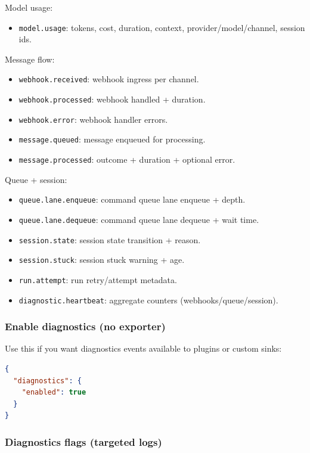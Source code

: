 Model usage:

\begin{itemize}
  \item \texttt{model.usage}: tokens, cost, duration, context, provider/model/channel, session ids.
\end{itemize}


Message flow:

\begin{itemize}
  \item \texttt{webhook.received}: webhook ingress per channel.
  \item \texttt{webhook.processed}: webhook handled + duration.
  \item \texttt{webhook.error}: webhook handler errors.
  \item \texttt{message.queued}: message enqueued for processing.
  \item \texttt{message.processed}: outcome + duration + optional error.
\end{itemize}


Queue + session:

\begin{itemize}
  \item \texttt{queue.lane.enqueue}: command queue lane enqueue + depth.
  \item \texttt{queue.lane.dequeue}: command queue lane dequeue + wait time.
  \item \texttt{session.state}: session state transition + reason.
  \item \texttt{session.stuck}: session stuck warning + age.
  \item \texttt{run.attempt}: run retry/attempt metadata.
  \item \texttt{diagnostic.heartbeat}: aggregate counters (webhooks/queue/session).
\end{itemize}


\subsubsection{Enable diagnostics (no exporter)}


Use this if you want diagnostics events available to plugins or custom sinks:

\begin{lstlisting}[language=json]
{
  "diagnostics": {
    "enabled": true
  }
}
\end{lstlisting}


\subsubsection{Diagnostics flags (targeted logs)}


